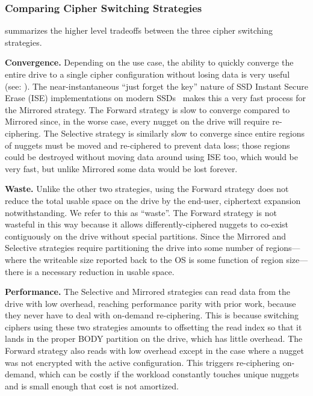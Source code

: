 
\subsubsection{Comparing Cipher Switching Strategies}






 summarizes the higher level tradeoffs between the
three cipher switching strategies.

\textbf{Convergence.} Depending on the use case, the ability to quickly converge
the entire drive to a single cipher configuration without losing data is very
useful (see: ). The near-instantaneous ``just forget the key''
nature of SSD Instant Secure Erase (ISE) implementations on modern
SSDs~\cite{ISE1,ISE2,ISE3} makes this a very fast process for the Mirrored
strategy. The Forward strategy is slow to converge compared to Mirrored since,
in the worse case, every nugget on the drive will require re-ciphering. The
Selective strategy is similarly slow to converge since entire regions of nuggets
must be moved and re-ciphered to prevent data loss; those regions could be
destroyed without moving data around using ISE too, which would be very fast,
but unlike Mirrored some data would be lost forever.

\textbf{Waste.} Unlike the other two strategies, using the Forward strategy does
not reduce the total usable space on the drive by the end-user, ciphertext
expansion notwithstanding. We refer to this as ``waste''. The Forward strategy
is not wasteful in this way because it allows differently-ciphered nuggets to
co-exist contiguously on the drive without special partitions. Since the
Mirrored and Selective strategies require partitioning the drive into some
number of regions---where the writeable size reported back to the OS is some
function of region size---there is a necessary reduction in usable space.

\textbf{Performance.} The Selective and Mirrored strategies can read data from
the drive with low overhead, reaching performance parity with prior work,
because they never have to deal with on-demand re-ciphering. This is because
switching ciphers using these two strategies amounts to offsetting the read
index so that it lands in the proper BODY partition on the drive, which has
little overhead. The Forward strategy also reads with low overhead except in the
case where a nugget was not encrypted with the active configuration. This
triggers re-ciphering on-demand, which can be costly if the workload constantly
touches unique nuggets and is small enough that cost is not amortized.

